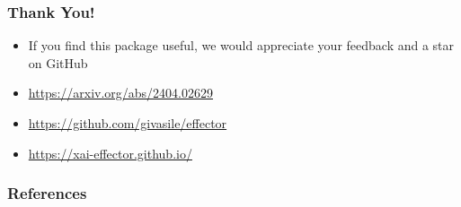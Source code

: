 \documentclass{beamer}
\begin{document}


\begin{frame}
  \frametitle{Thank You!}
  \begin{itemize}
  \item If you find this package useful, we would appreciate your feedback and a star on GitHub
  \item \href{https://arxiv.org/abs/2404.02629}{https://arxiv.org/abs/2404.02629}
  \item \href{https://github.com/givasile/effector}{https://github.com/givasile/effector}
  \item \href{https://xai-effector.github.io/}{https://xai-effector.github.io/}
  \end{itemize}

\end{frame}



\begin{frame}[allowframebreaks]
  \frametitle{References}
  \printbibliography
\end{frame}
\end{document}

